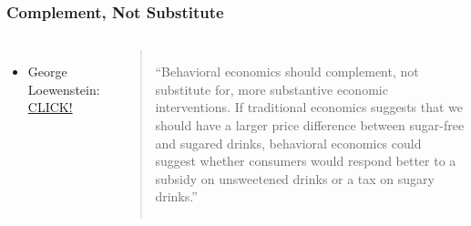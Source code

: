 \documentclass[final]{beamer}
\begin{document}
%
\begin{frame}\frametitle{Complement, Not Substitute}\vspace{1.5em}
\begin{columns}[c]
\column{12em}
\hspace{0em}
\column{19em}
\begin{itemize}
\item George Loewenstein: \href{http://www.nytimes.com/2010/07/15/opinion/15loewenstein.html}{CLICK!}
\end{itemize}
\begin{quote}\small
``Behavioral economics should complement, not substitute for, more substantive economic interventions. If traditional economics suggests that we should have a larger price difference between sugar-free and sugared drinks, behavioral economics could suggest whether consumers would respond better to a subsidy on unsweetened drinks or a tax on sugary drinks.''
\end{quote}
\end{columns}
\end{frame}
%
\end{document}
